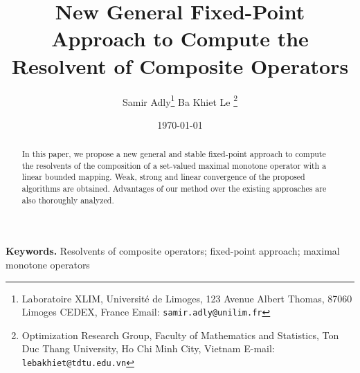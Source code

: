 \documentclass[11pt]{article}
\theoremstyle{plain}
\begin{document}
\title{{New  General Fixed-Point Approach to Compute the Resolvent of Composite Operators}}
\author{Samir Adly\thanks{Laboratoire XLIM, Universit\'e de Limoges,
123 Avenue Albert Thomas,
87060 Limoges CEDEX, France\vskip 0mm
Email: \texttt{samir.adly@unilim.fr}}
 \qquad Ba Khiet Le \thanks{Optimization Research Group, Faculty of Mathematics and Statistics, Ton Duc Thang University, Ho Chi Minh City, Vietnam\vskip 0mm
 E-mail: \texttt{lebakhiet@tdtu.edu.vn}}
 }
\date{\today}
\maketitle
\begin{abstract}
In this paper,  we  propose a new general  and stable  fixed-point approach to  compute the resolvents of the composition of a set-valued maximal monotone operator with a linear bounded mapping. Weak, strong and linear convergence of the proposed algorithms are obtained. Advantages of our method over the existing approaches are also thoroughly analyzed. 
\end{abstract}
 {\bf Keywords.} Resolvents of composite operators;  fixed-point approach; maximal monotone operators
\end{document}
